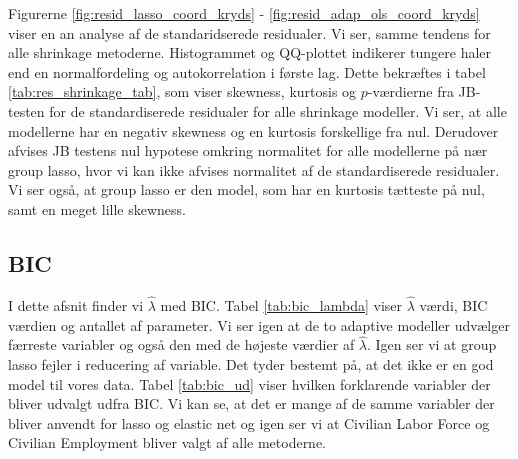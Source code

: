 Figurerne \ref{fig:resid_lasso_coord_kryds} - \ref{fig:resid_adap_ols_coord_kryds} viser en an analyse af de standaridserede residualer. 
Vi ser, samme tendens for alle shrinkage metoderne. Histogrammet og QQ-plottet indikerer tungere haler end en normalfordeling og autokorrelation i første lag.
Dette bekræftes i tabel  \ref{tab:res_shrinkage_tab}, som viser skewness, kurtosis og $p$-værdierne fra JB-testen for de standardiserede residualer for alle shrinkage modeller. 
Vi ser, at alle modellerne har en negativ skewness og en kurtosis forskellige fra nul. 
Derudover afvises JB testens nul hypotese omkring normalitet for alle modellerne på nær group lasso, hvor vi kan ikke afvises normalitet af de standardiserede residualer. 
Vi ser også, at group lasso er den model, som har en kurtosis tætteste på nul, samt en meget lille skewness. 
\newpage

\subsection{BIC}
I dette afsnit finder vi $\widehat{\lambda}$ med BIC. 
Tabel \ref{tab:bic_lambda} viser $\widehat{\lambda}$ værdi, BIC værdien og antallet af parameter. Vi ser igen at de to adaptive modeller udvælger færreste variabler og også den med de højeste værdier af $\widehat{\lambda}$. 
Igen ser vi at group lasso fejler i reducering af variable. Det tyder bestemt på, at det ikke er en god model til vores data. 
Tabel \ref{tab:bic_ud} viser hvilken forklarende variabler der bliver udvalgt udfra BIC. 
Vi kan se, at det er mange af de samme variabler der bliver anvendt for lasso og elastic net og igen ser vi at Civilian Labor Force og Civilian Employment bliver valgt af alle metoderne. 




